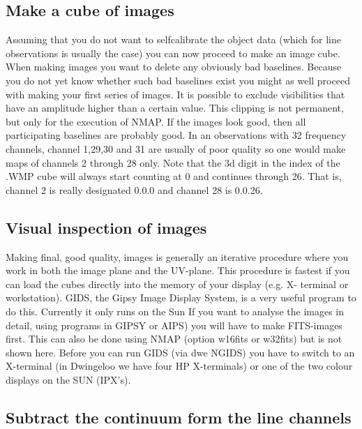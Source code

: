 \subsection{Make a cube of images} 
\label{.detail.makecube} 

Assuming that you do not want to selfcalibrate the object data (which for line
observations is usually the case) you can now proceed to make an image cube.
When making images you want to delete any obviously bad baselines. Because you
do not yet know whether such bad baselines exist you might as well proceed with
making your first series of images. It is possible to exclude visibilities that
have an amplitude higher than a certain value. This clipping is not permanent,
but only for the execution of NMAP. If the images look good, then all
participating baselines are probably good. In an observations with 32 frequency
channels, channel 1,29,30 and 31 are usually of poor quality so one would make
maps of channels 2 through 28 only. Note that the 3d digit in the index of the
.WMP cube will always start counting at 0 and continues through 26. That is,
channel 2 is really designated 0.0.0 and channel 28 is 0.0.26. 


\subsection{Visual inspection of images} 
\label{.detail.visinsp} 

Making final, good quality, images is generally an iterative procedure where
you work in both the image plane and the UV-plane. This procedure is fastest if
you can load the cubes directly into the memory of your display (e.g. X-
terminal or workstation). GIDS, the Gipsy Image Display System, is a very
useful program to do this. Currently it only runs on the Sun If you want to
analyse the images in detail, using programs in GIPSY or AIPS) you will have to
make FITS-images first. This can also be done using NMAP (option w16fits or
w32fits) but is not shown here. Before you can run GIDS (via dwe NGIDS) you
have to switch to an X-terminal (in Dwingeloo we have four HP X-terminals) or
one of the two colour displays on the SUN (IPX's). 

\subsection{Subtract the continuum form the line channels} 
\label{.detail.subcont} 

